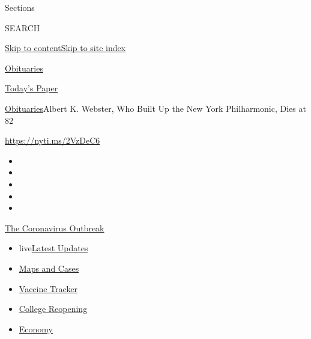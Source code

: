 Sections

SEARCH

\protect\hyperlink{site-content}{Skip to
content}\protect\hyperlink{site-index}{Skip to site index}

\href{https://www.nytimes3xbfgragh.onion/section/obituaries}{Obituaries}

\href{https://myaccount.nytimes3xbfgragh.onion/auth/login?response_type=cookie\&client_id=vi}{}

\href{https://www.nytimes3xbfgragh.onion/section/todayspaper}{Today's
Paper}

\href{/section/obituaries}{Obituaries}\textbar{}Albert K. Webster, Who
Built Up the New York Philharmonic, Dies at 82

\url{https://nyti.ms/2VzDeC6}

\begin{itemize}
\item
\item
\item
\item
\item
\end{itemize}

\href{https://www.nytimes3xbfgragh.onion/news-event/coronavirus?action=click\&pgtype=Article\&state=default\&region=TOP_BANNER\&context=storylines_menu}{The
Coronavirus Outbreak}

\begin{itemize}
\tightlist
\item
  live\href{https://www.nytimes3xbfgragh.onion/2020/08/04/world/coronavirus-covid-19.html?action=click\&pgtype=Article\&state=default\&region=TOP_BANNER\&context=storylines_menu}{Latest
  Updates}
\item
  \href{https://www.nytimes3xbfgragh.onion/interactive/2020/us/coronavirus-us-cases.html?action=click\&pgtype=Article\&state=default\&region=TOP_BANNER\&context=storylines_menu}{Maps
  and Cases}
\item
  \href{https://www.nytimes3xbfgragh.onion/interactive/2020/science/coronavirus-vaccine-tracker.html?action=click\&pgtype=Article\&state=default\&region=TOP_BANNER\&context=storylines_menu}{Vaccine
  Tracker}
\item
  \href{https://www.nytimes3xbfgragh.onion/2020/08/02/us/covid-college-reopening.html?action=click\&pgtype=Article\&state=default\&region=TOP_BANNER\&context=storylines_menu}{College
  Reopening}
\item
  \href{https://www.nytimes3xbfgragh.onion/live/2020/08/03/business/stock-market-today-coronavirus?action=click\&pgtype=Article\&state=default\&region=TOP_BANNER\&context=storylines_menu}{Economy}
\end{itemize}

